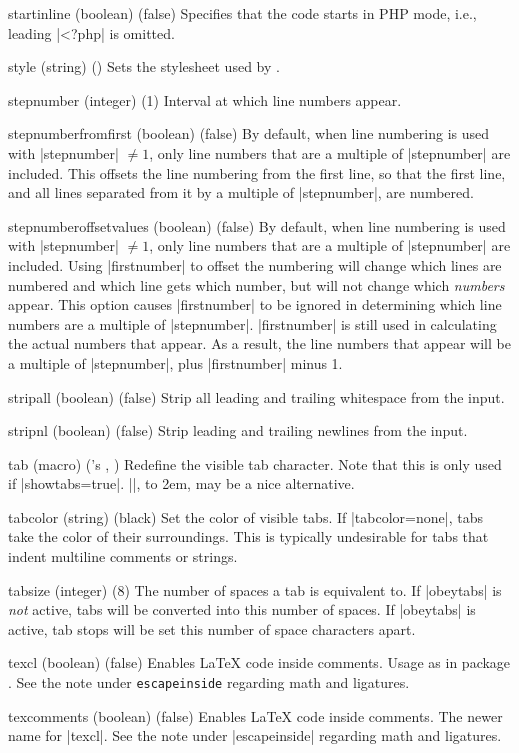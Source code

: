 \begin{optionlist}
  \item[startinline (boolean) (false)] 
    Specifies that the code starts in PHP mode, i.e., leading |<?php| is omitted.
  \item[style] (string) ()
    Sets the stylesheet used by .
  \item[stepnumber (integer) (1)]
    Interval at which line numbers appear.


\item[stepnumberfromfirst (boolean) (false)]
By default, when line numbering is used with |stepnumber| $\ne 1$, only line numbers that are a multiple of |stepnumber| are included.  This offsets the line numbering from the first line, so that the first line, and all lines separated from it by a multiple of |stepnumber|, are numbered.


\item[stepnumberoffsetvalues (boolean) (false)]
By default, when line numbering is used with |stepnumber| $\ne 1$, only line numbers that are a multiple of |stepnumber| are included.  Using |firstnumber| to offset the numbering will change which lines are numbered and which line gets which number, but will not change which \emph{numbers} appear.  This option causes |firstnumber| to be ignored in determining which line numbers are a multiple of |stepnumber|.  |firstnumber| is still used in calculating the actual numbers that appear.  As a result, the line numbers that appear will be a multiple of |stepnumber|, plus |firstnumber| minus 1.


  \item[stripall (boolean) (false)]
    Strip all leading and trailing whitespace from the input.
  \item[stripnl (boolean) (false)]
    Strip leading and trailing newlines from the input.


\item[tab (macro) ({\rmfamily\pkg{fancyvrb}'s} \string\FancyVerbTab, \FancyVerbTab)]
Redefine the visible tab character.  Note that this is only used if |showtabs=true|.  |\rightarrowfill|, \hbox to 2em{\rightarrowfill}, may be a nice alternative.


\item[tabcolor (string) (black)]
Set the color of visible tabs.  If |tabcolor=none|, tabs take the color of their surroundings.  This is typically undesirable for tabs that indent multiline comments or strings.


  \item[tabsize (integer) (8)]
    The number of spaces a tab is equivalent to.  If |obeytabs| is \emph{not} active, tabs will be converted into this number of spaces.  If |obeytabs| is active, tab stops will be set this number of space characters apart.
  \item[texcl (boolean) (false)]
    Enables \LaTeX{} code inside comments.
    Usage as in package .  See the note under \texttt{escapeinside} regarding math and ligatures.
  \item[texcomments (boolean) (false)]
    Enables \LaTeX{} code inside comments.  The newer name for |texcl|.  See the note under |escapeinside| regarding math and ligatures.


\end{optionlist}
